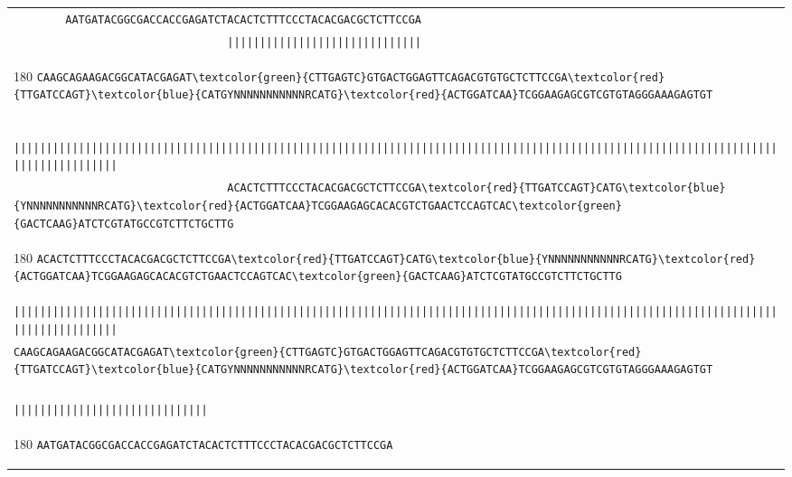 \documentclass[a4paper,12pt]{article}
\begin{document}
\begin{landscape}
\begin{flushleft}
\vspace{3cm}

\begin{tabular}{l}

   \Verb+        AATGATACGGCGACCACCGAGATCTACACTCTTTCCCTACACGACGCTCTTCCGA+\\[-8pt]
   \Verb+                                 ||||||||||||||||||||||||||||||+\\[-12pt]
   \begin{turn}{180}
      \Verb+CAAGCAGAAGACGGCATACGAGAT\textcolor{green}{CTTGAGTC}GTGACTGGAGTTCAGACGTGTGCTCTTCCGA\textcolor{red}{TTGATCCAGT}\textcolor{blue}{CATGYNNNNNNNNNNNRCATG}\textcolor{red}{ACTGGATCAA}TCGGAAGAGCGTCGTGTAGGGAAAGAGTGT                                 +
   \end{turn}\\[-4pt]
   \Verb+                                 ||||||||||||||||||||||||||||||||||||||||||||||||||||||||||||||||||||||||||||||||||||||||||||||||||||||||||||||||||||||||||||||||||||||+\\[-8pt]
   \Verb+                                 ACACTCTTTCCCTACACGACGCTCTTCCGA\textcolor{red}{TTGATCCAGT}CATG\textcolor{blue}{YNNNNNNNNNNNRCATG}\textcolor{red}{ACTGGATCAA}TCGGAAGAGCACACGTCTGAACTCCAGTCAC\textcolor{green}{GACTCAAG}ATCTCGTATGCCGTCTTCTGCTTG+\\
   \begin{turn}{180}
      \Verb+ACACTCTTTCCCTACACGACGCTCTTCCGA\textcolor{red}{TTGATCCAGT}CATG\textcolor{blue}{YNNNNNNNNNNNRCATG}\textcolor{red}{ACTGGATCAA}TCGGAAGAGCACACGTCTGAACTCCAGTCAC\textcolor{green}{GACTCAAG}ATCTCGTATGCCGTCTTCTGCTTG+
   \end{turn}\\[-4pt]
   \Verb+||||||||||||||||||||||||||||||||||||||||||||||||||||||||||||||||||||||||||||||||||||||||||||||||||||||||||||||||||||||||||||||||||||||+\\[-8pt]
   \Verb+CAAGCAGAAGACGGCATACGAGAT\textcolor{green}{CTTGAGTC}GTGACTGGAGTTCAGACGTGTGCTCTTCCGA\textcolor{red}{TTGATCCAGT}\textcolor{blue}{CATGYNNNNNNNNNNNRCATG}\textcolor{red}{ACTGGATCAA}TCGGAAGAGCGTCGTGTAGGGAAAGAGTGT+\\[-8pt]
   \Verb+                                                                                                        ||||||||||||||||||||||||||||||+\\[-12pt]
   \begin{turn}{180}
      \Verb+AATGATACGGCGACCACCGAGATCTACACTCTTTCCCTACACGACGCTCTTCCGA                                                                                                        +
   \end{turn}\\[-8pt]
\end{tabular}


\end{flushleft}
\end{landscape}
\end{document}
